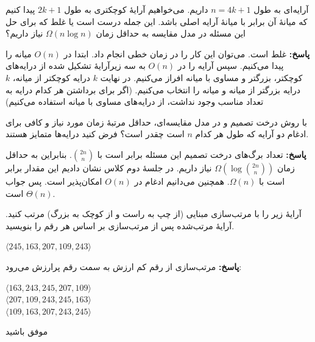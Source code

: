 \documentclass[12pt, a4paper]{article}
\newcommand{\vsp}{\vspace{25pt}}
\newcommand{\پاسخ}[2]{\color{answercolor}\textbf{پاسخ: }#2\color{black}\vspace{-0.3cm}}
\begin{document}
آرایه‌ای به طول $n=4k+1$ داریم. می‌خواهیم آرایۀ کوچکتری به طول $2k+1$ پیدا کنیم که میانۀ آن برابر با میانۀ آرایه اصلی باشد. این جمله درست است یا غلط که برای حل این مسئله در مدل مقایسه به حداقل زمان $\Omega(n\log n)$ نیاز داریم؟

\پاسخ{\vsp\vsp}{
	غلط است. می‌توان این کار را در زمان خطی انجام داد. ابتدا در $O(n)$ میانه را پیدا می‌کنیم. سپس آرایه را در $O(n)$ به سه زیرآرایۀ تشکیل شده از درایه‌های کوچکتر، بزرگتر و مساوی با میانه افراز می‌کنیم. در نهایت $k$ درایه کوچکتر از میانه، $k$ درایه بزرگتر از میانه و میانه را انتخاب می‌کنیم. (اگر برای برداشتن هر کدام درایه به تعداد مناسب وجود نداشت، از درایه‌های مساوی با میانه استفاده می‌کنیم)
	
}

با روش درخت تصمیم و در مدل مقایسه‌ای، حداقل مرتبۀ زمان مورد نیاز و کافی برای ادغام دو آرایه که طول هر کدام $n$ است چقدر است؟ فرض کنید درایه‌ها متمایز هستند.

\پاسخ{\vsp\vsp}{
	تعداد برگ‌های درخت تصمیم این مسئله برابر است با $\binom{2n}{n}$. بنابراین به حداقل زمان $\Omega(\log\binom{2n}{n})$ نیاز داریم. در جلسۀ دوم کلاس نشان دادیم این مقدار برابر است با $\Omega(n)$. همچنین می‌دانیم ادغام در $O(n)$ امکان‌پذیر است. پس جواب $\Theta(n)$ است.
	
}

آرایۀ زیر را با مرتب‌سازی مبنایی (از چپ به راست و از کوچک به بزرگ) مرتب کنید. آرایۀ مرتب‌شده پس از مرتب‌سازی بر اساس هر رقم را بنویسید.
\begin{flushleft}
	$\langle 245, 163, 207, 109, 243\rangle$
\end{flushleft}

\پاسخ{\vsp\vsp}{مرتب‌سازی از رقم کم ارزش به سمت رقم پرارزش می‌رود:
\begin{flushleft}
	$\langle 163, 243, 245, 207, 109\rangle$\\
	$\langle 207, 109, 243, 245, 163\rangle$\\
	$\langle 109, 163, 207, 243, 245\rangle$
\end{flushleft}
}
\begin{flushleft}
موفق باشید
\end{flushleft}
\end{document}

